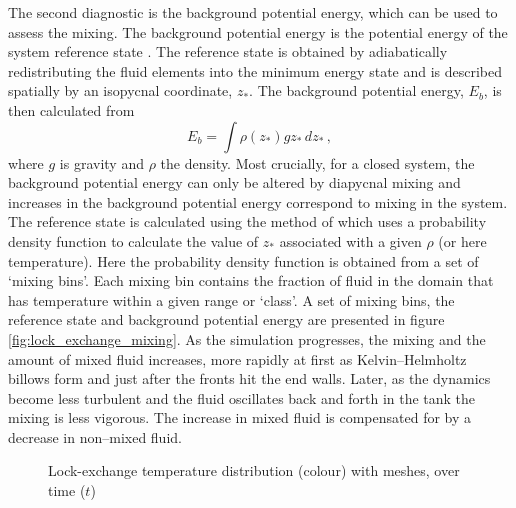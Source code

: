 The second diagnostic is the background potential energy, which can be used to assess the mixing. The background potential energy is the potential energy of the system reference state \citep{winters1995, winters1996}. The reference state is obtained by adiabatically redistributing the fluid elements into the minimum energy state and is described spatially by an isopycnal coordinate, $z_*$. The background potential energy, $E_b$, is then calculated from
\begin{equation}
E_b = \int \rho(z_*) g z_* \, dz_* \, ,
\end{equation}
where $g$ is gravity and $\rho$ the density. Most crucially, for a closed system, the background potential energy can only be altered by diapycnal mixing and increases in the background potential energy correspond to mixing in the system. The reference state is calculated using the method of \citet{tseng2001} which uses a probability density function to calculate the value of $z_*$ associated with a given $\rho$ (or here temperature). Here the probability density function is obtained from a set of `mixing bins'. Each mixing bin contains the fraction of fluid in the domain that has temperature within a given range or `class'. A set of mixing bins, the reference state and background potential energy are presented in figure \ref{fig:lock_exchange_mixing}. As the simulation progresses, the mixing and the amount of mixed fluid increases, more rapidly at first as Kelvin--Helmholtz billows form and just after the fronts hit the end walls. Later, as the dynamics become less turbulent and the fluid oscillates back
and forth in the tank the mixing is less vigorous. The increase in mixed fluid is compensated for by a decrease in non--mixed fluid.


\begin{figure}[ht]
  \centering
  \caption{Lock-exchange temperature distribution (colour) with meshes, over time ($t$)}
  \label{fig:lock_exchange}
\end{figure}

